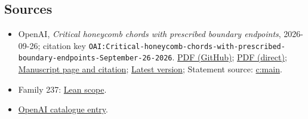 \documentclass[11pt]{article}
\begin{document}
\subsection{Sources}
\begin{itemize}
\item OpenAI, \emph{Critical honeycomb chords with prescribed boundary endpoints}, 2026-09-26; citation key \texttt{OAI:Critical-honeycomb-chords-with-prescribed-boundary-endpoints-September-26-2026}. \href{https://github.com/openai/math/blob/adc7f1241b42e322a6451854ab7e4b4c146bf78a/preprints/Critical-honeycomb-chords-with-prescribed-boundary-endpoints-September-26-2026/main.pdf}{PDF (GitHub)}; \href{https://github.com/openai/math/raw/adc7f1241b42e322a6451854ab7e4b4c146bf78a/preprints/Critical-honeycomb-chords-with-prescribed-boundary-endpoints-September-26-2026/main.pdf}{PDF (direct)}; \href{https://github.com/openai/math/blob/adc7f1241b42e322a6451854ab7e4b4c146bf78a/preprints/Critical-honeycomb-chords-with-prescribed-boundary-endpoints-September-26-2026/README.md}{Manuscript page and citation}; \href{https://github.com/openai/math/blob/main/preprints/Critical-honeycomb-chords-with-prescribed-boundary-endpoints-September-26-2026/main.pdf}{Latest version}; Statement source: \href{https://github.com/openai/math/blob/adc7f1241b42e322a6451854ab7e4b4c146bf78a/preprints/Critical-honeycomb-chords-with-prescribed-boundary-endpoints-September-26-2026/build/sections/introduction.tex\#L31}{c:main}.
\item Family 237: \href{https://github.com/openai/math/blob/adc7f1241b42e322a6451854ab7e4b4c146bf78a/lean/docs/237.md}{Lean scope}.
\item \href{https://github.com/openai/math/blob/adc7f1241b42e322a6451854ab7e4b4c146bf78a/CONTENTS.md}{OpenAI catalogue entry}.
\end{itemize}
\end{document}

